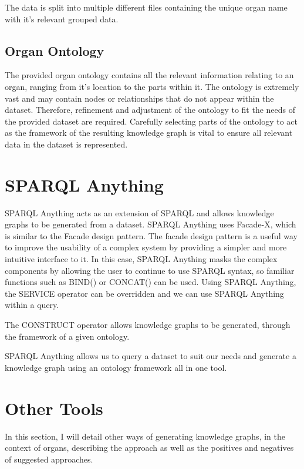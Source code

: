 The data is split into multiple different files containing the unique organ name with it's relevant grouped data.  

\subsection{Organ Ontology}
The provided organ ontology contains all the relevant information relating to an organ, ranging from it's location to the parts within it. The ontology is extremely vast and may contain nodes or relationships that do not appear within the dataset. Therefore, refinement and adjustment of the ontology to fit the needs of the provided dataset are required. Carefully selecting parts of the ontology to act as the framework of the resulting knowledge graph is vital to ensure all relevant data in the dataset is represented. 

\section{SPARQL Anything}
\hspace{0.5cm} SPARQL Anything acts as an extension of SPARQL and allows knowledge graphs to be generated from a dataset. SPARQL Anything uses Facade-X, which is similar to the Facade design pattern. The facade design pattern is a useful way to improve the usability of a complex system by providing a simpler and more intuitive interface to it. In this case, SPARQL Anything masks the complex components by allowing the user to continue to use SPARQL syntax, so familiar functions such as BIND() or CONCAT() can be used. Using SPARQL Anything, the SERVICE operator can be overridden and we can use SPARQL Anything within a query. \cite{sparqlanything}

The CONSTRUCT operator allows knowledge graphs to be generated, through the framework of a given ontology. \cite{sparqlanythinggithub}

SPARQL Anything allows us to query a dataset to suit our needs and generate a knowledge graph using an ontology framework all in one tool. \cite{sparqlanythinggithub}

\section{Other Tools}

\hspace{0.5cm} In this section, I will detail other ways of generating knowledge graphs, in the context of organs, describing the approach as well as the positives and negatives of suggested approaches.

